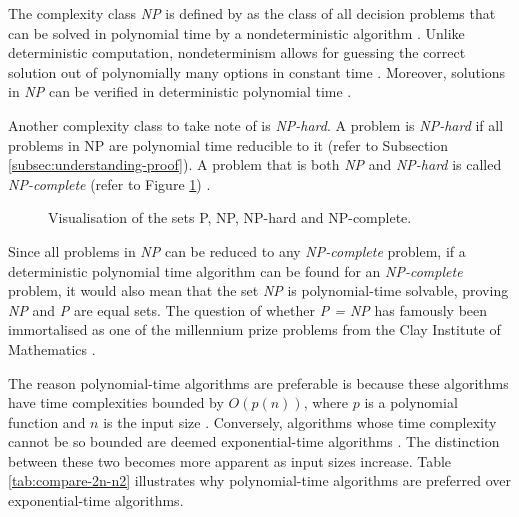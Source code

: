 \documentclass[a4paper, 12pt]{extreport}
\begin{document}
				The complexity class \textit{NP} is defined by \citeauthor{computers-and-intractability} as the class of all decision problems that can be solved in polynomial time by a nondeterministic algorithm \cite{computers-and-intractability}. Unlike deterministic computation, nondeterminism allows for guessing the correct solution out of polynomially many options in constant time \cite{npcompleteness}. Moreover, solutions in \textit{NP} can be verified in deterministic polynomial time \cite{sipser-intro-to-computation}.
				
				Another complexity class to take note of is \textit{NP-hard}. A problem is \textit{NP-hard} if all problems in NP are polynomial time reducible to it (refer to Subsection  \ref{subsec:understanding-proof})\cite{sipser-intro-to-computation}. A problem that is both \textit{NP} and \textit{NP-hard} is called \textit{NP-complete} (refer to Figure \ref{fig:p,np,npcomplete}) \cite{npcompleteness}.
				
				\begin{figure}
					\centering
					\caption{\centering Visualisation of the sets P, NP, NP-hard and NP-complete.}
					\label{fig:p,np,npcomplete}
				\end{figure}
				
				Since all problems in \textit{NP} can be reduced to any \textit{NP-complete} problem, if a deterministic polynomial time algorithm can be found for an \textit{NP-complete} problem, it would also mean that the set \textit{NP} is polynomial-time solvable, proving \textit{NP} and \textit{P} are equal sets. The question of whether \textit{P = NP} has famously been immortalised as one of the millennium prize problems from the Clay Institute of Mathematics \cite{claymathMillenniumPrize}.
				
				
				The reason polynomial-time algorithms are preferable is because these algorithms have time complexities bounded by $O(p(n))$, where $p$ is a polynomial function and $n$ is the input size \cite{computers-and-intractability}. Conversely, algorithms whose time complexity cannot be so bounded are deemed exponential-time algorithms \cite{computers-and-intractability}. The distinction between these two becomes more apparent as input sizes increase. Table \ref{tab:compare-2n-n2} illustrates why polynomial-time algorithms are preferred over exponential-time algorithms.
				
\end{document}
